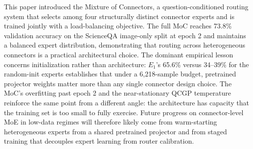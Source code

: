 \documentclass{article}
\begin{document}
This paper introduced the Mixture of Connectors, a question-conditioned routing system that selects among four structurally distinct connector experts and is trained jointly with a load-balancing objective. The full MoC reaches 73.8\% validation accuracy on the ScienceQA image-only split at epoch 2 and maintains a balanced expert distribution, demonstrating that routing across heterogeneous connectors is a practical architectural choice. The dominant empirical lesson concerns initialization rather than architecture: $E_1$'s 65.6\% versus 34--39\% for the random-init experts establishes that under a 6{,}218-sample budget, pretrained projector weights matter more than any single connector design choice. The MoC's overfitting past epoch 2 and the near-stationary QCGP temperature reinforce the same point from a different angle: the architecture has capacity that the training set is too small to fully exercise. Future progress on connector-level MoE in low-data regimes will therefore likely come from warm-starting heterogeneous experts from a shared pretrained projector and from staged training that decouples expert learning from router calibration.



\end{document}
